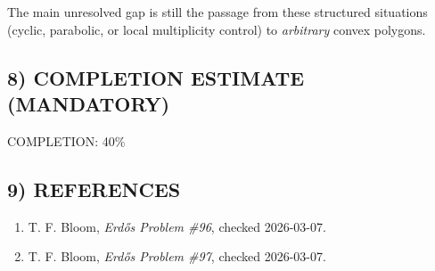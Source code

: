 The main unresolved gap is still the passage from these structured situations (cyclic, parabolic, or local multiplicity control) to \emph{arbitrary} convex polygons.

\subsection*{8) COMPLETION ESTIMATE (MANDATORY)}

COMPLETION: 40\%

\subsection*{9) REFERENCES}

\begin{enumerate}
\item T. F. Bloom, \emph{Erdős Problem \#96}, checked 2026-03-07.
\item T. F. Bloom, \emph{Erdős Problem \#97}, checked 2026-03-07.
\end{enumerate}
